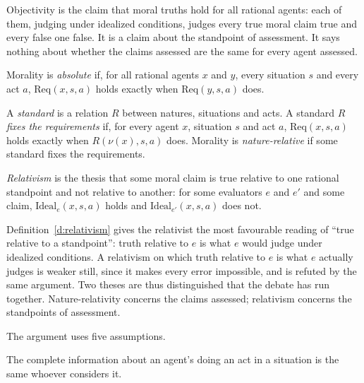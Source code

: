 \documentclass{situationist-preprint}
\begin{document}
Objectivity is the claim that moral truths hold for all rational agents: each of them, judging under idealized conditions, judges every true moral claim true and every false one false. It is a claim about the standpoint of assessment. It says nothing about whether the claims assessed are the same for every agent assessed.

\begin{definition}[Absoluteness]\label{d:absolute}
Morality is \emph{absolute} if, for all rational agents $x$ and $y$, every situation $s$ and every act $a$, $\mathrm{Req}(x,s,a)$ holds exactly when $\mathrm{Req}(y,s,a)$ does.
\end{definition}

\begin{definition}\label{d:relative}
A \emph{standard} is a relation $R$ between natures, situations and acts. A standard $R$ \emph{fixes the requirements} if, for every agent $x$, situation $s$ and act $a$, $\mathrm{Req}(x,s,a)$ holds exactly when $R(\nu(x),s,a)$ does. Morality is \emph{nature-relative} if some standard fixes the requirements.
\end{definition}

\begin{definition}[Relativism]\label{d:relativism}
\emph{Relativism} is the thesis that some moral claim is true relative to one rational standpoint and not relative to another: for some evaluators $e$ and $e'$ and some claim, $\mathrm{Ideal}_e(x,s,a)$ holds and $\mathrm{Ideal}_{e'}(x,s,a)$ does not.
\end{definition}

Definition~\ref{d:relativism} gives the relativist the most favourable reading of \enquote{true relative to a standpoint}: truth relative to $e$ is what $e$ would judge under idealized conditions. A relativism on which truth relative to $e$ is what $e$ actually judges is weaker still, since it makes every error impossible, and is refuted by the same argument. Two theses are thus distinguished that the debate has run together. Nature-relativity concerns the claims assessed; relativism concerns the standpoints of assessment.

The argument uses five assumptions.

\begin{assumption}\label{a:info}
The complete information about an agent's doing an act in a situation is the same whoever considers it.
\end{assumption}
\end{document}

